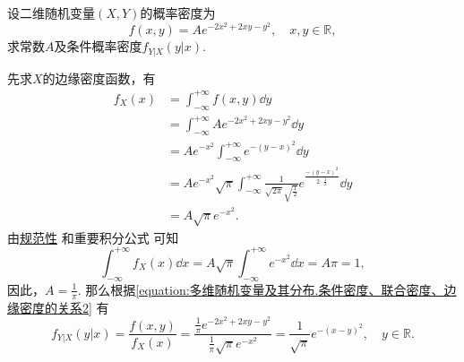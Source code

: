 \begin{example}
设二维随机变量\((X,Y)\)的概率密度为\[
	f(x,y) = A e^{-2x^2+2xy-y^2}, \quad x,y\in\mathbb{R},
\]
求常数\(A\)及条件概率密度\(f_{Y \vert X}(y \vert x)\).
\begin{solution}
先求\(X\)的边缘密度函数，有\begin{align*}
	f_X(x) &= \int_{-\infty}^{+\infty} f(x,y) \dd{y} \\
	&= \int_{-\infty}^{+\infty} A e^{-2x^2+2xy-y^2} \dd{y} \\
	&= A e^{-x^2} \int_{-\infty}^{+\infty} e^{-(y-x)^2} \dd{y} \\
	&= A e^{-x^2} \sqrt{\pi} \int_{-\infty}^{+\infty}
		\frac{1}{\sqrt{2\pi} \sqrt{\frac{1}{2}}}
		e^{\frac{-(y-x)^2}{2 \cdot \frac{1}{2}}} \dd{y} \\
	&= A \sqrt{\pi} e^{-x^2}.
\end{align*}
由\hyperref[theorem:随机变量及其分布.连续型随机变量的密度函数的性质]{规范性}%
和重要积分公式  可知\[
	\int_{-\infty}^{+\infty} f_X(x) \dd{x}
	= A \sqrt{\pi} \int_{-\infty}^{+\infty} e^{-x^2} \dd{x}
	= A \pi = 1,
\]
因此，\(A = \frac{1}{\pi}\).
那么根据\cref{equation:多维随机变量及其分布.条件密度、联合密度、边缘密度的关系2} 有\[
	f_{Y \vert X}(y \vert x)
	= \frac{f(x,y)}{f_X(x)}
	= \frac{\frac{1}{\pi} e^{-2x^2+2xy-y^2}}{\frac{1}{\pi} \sqrt{\pi} e^{-x^2}}
	= \frac{1}{\sqrt{\pi}} e^{-(x-y)^2},
	\quad y\in\mathbb{R}.
\]
\end{solution}
\end{example}
